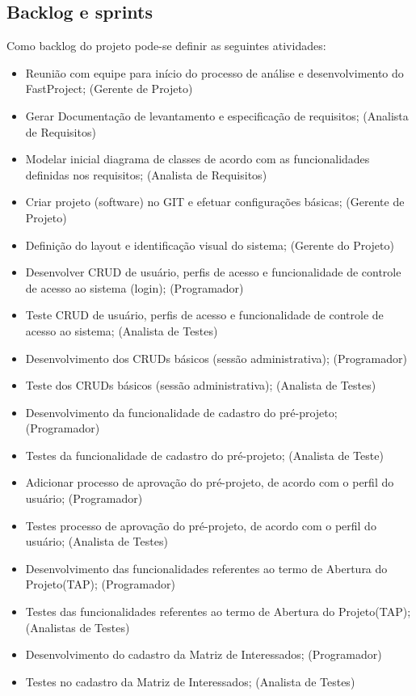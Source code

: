 \documentclass[	DIV=calc,%
							paper=a4,%
							fontsize=12pt,%
							onecolumn]{scrartcl}	 					%
\begin{document}
\subsection{Backlog e sprints}
Como backlog do projeto pode-se definir as seguintes atividades:
\begin{itemize}
	\item Reunião com equipe para início do processo de análise e desenvolvimento do FastProject; (Gerente de Projeto)
	\item Gerar Documentação de levantamento e especificação de requisitos; (Analista de Requisitos)
	\item Modelar inicial diagrama de classes de acordo com as funcionalidades definidas nos requisitos; (Analista de Requisitos)
	\item Criar projeto (software) no GIT e efetuar configurações básicas; (Gerente de Projeto)
	\item Definição do layout e identificação visual do sistema; (Gerente do Projeto)
	\item Desenvolver CRUD de usuário, perfis de acesso e funcionalidade de controle de acesso ao sistema (login); (Programador)
	\item Teste CRUD de usuário, perfis de acesso e funcionalidade de controle de acesso ao sistema; (Analista de Testes)
	\item Desenvolvimento dos CRUDs básicos (sessão administrativa); (Programador)
	\item Teste dos CRUDs básicos (sessão administrativa); (Analista de Testes)
	\item Desenvolvimento da funcionalidade de cadastro do pré-projeto; (Programador)
	\item Testes da funcionalidade de cadastro do pré-projeto; (Analista de Teste)
	\item Adicionar processo de aprovação do pré-projeto, de acordo com o perfil do usuário; (Programador)
	\item Testes processo de aprovação do pré-projeto, de acordo com o perfil do usuário; (Analista de Testes)
	\item Desenvolvimento das funcionalidades referentes ao termo de Abertura do Projeto(TAP); (Programador)
	\item Testes das funcionalidades referentes ao termo de Abertura do Projeto(TAP); (Analistas de Testes)
	\item Desenvolvimento do cadastro da Matriz de Interessados; (Programador)
	\item Testes no cadastro da Matriz de Interessados; (Analista de Testes)

\end{itemize}
\end{document}
